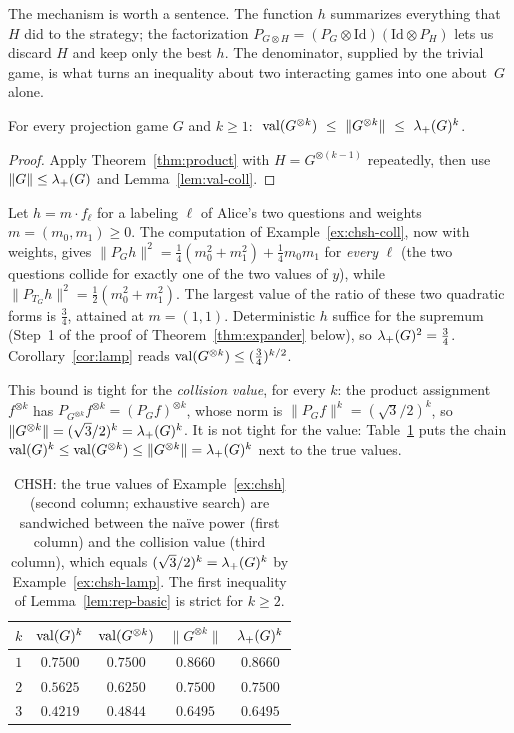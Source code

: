 \noindent
The mechanism is worth a sentence.  The function $h$ summarizes everything that $H$ did to the strategy; the factorization $P_{G\otimes H}=(P_G\otimes\mathrm{Id})(\mathrm{Id}\otimes P_H)$ lets us discard $H$ and keep only the best $h$.
The denominator, supplied by the trivial game, is what turns an inequality about two interacting games into one about~$G$ alone.

\begin{corollary}\label{cor:lamp}
For every projection game $G$ and $k\ge1$: $\ \operatorname{val}(G^{\otimes k})\ \le\ \|G^{\otimes k}\|\ \le\ \lambda_{+}(G)^k$.
\end{corollary}
\begin{proof}
Apply Theorem~\ref{thm:product} with $H=G^{\otimes(k-1)}$ repeatedly, then use $\|G\|\le\lambda_{+}(G)$ and Lemma~\ref{lem:val-coll}.
\end{proof}

\begin{example}\label{ex:chsh-lamp}
Let $h=m\cdot f_\ell$ for a labeling $\ell$ of Alice's two questions and weights $m=(m_0,m_1)\ge0$.  The computation of Example~\ref{ex:chsh-coll}, now with weights, gives $\|P_Gh\|^2=\frac14(m_0^2+m_1^2)+\frac14m_0m_1$ for \emph{every} $\ell$ (the two questions collide for exactly one of the two values of $y$), while $\|P_{T_G}h\|^2=\frac12(m_0^2+m_1^2)$.
The largest value of the ratio of these two quadratic forms is $\frac34$, attained at $m=(1,1)$.  Deterministic $h$ suffice for the supremum (Step~1 of the proof of Theorem~\ref{thm:expander} below), so $\lambda_{+}(G)^2=\frac34$.  Corollary~\ref{cor:lamp} reads $\operatorname{val}(G^{\otimes k})\le(\frac34)^{k/2}$.

This bound is tight for the \emph{collision value}, for every $k$: the product assignment $f^{\otimes k}$ has $P_{G^{\otimes k}}f^{\otimes k}=(P_Gf)^{\otimes k}$, whose norm is $\|P_Gf\|^k=(\sqrt3/2)^k$, so $\|G^{\otimes k}\|=(\sqrt3/2)^k=\lambda_{+}(G)^k$.
It is not tight for the value: Table~\ref{tab:chsh-sandwich} puts the chain $\operatorname{val}(G)^k\le\operatorname{val}(G^{\otimes k})\le\|G^{\otimes k}\|=\lambda_{+}(G)^k$ next to the true values.
\end{example}

\begin{table}[t]
\centering\small
\renewcommand{\arraystretch}{1.2}
\begin{tabular}{@{}rcccc@{}}
\toprule
$k$ & $\operatorname{val}(G)^k$ & $\operatorname{val}(G^{\otimes k})$ & $\|G^{\otimes k}\|$ & $\lambda_{+}(G)^k$\\
\midrule
$1$ & $0.7500$ & $0.7500$ & $0.8660$ & $0.8660$\\
$2$ & $0.5625$ & $0.6250$ & $0.7500$ & $0.7500$\\
$3$ & $0.4219$ & $0.4844$ & $0.6495$ & $0.6495$\\
\bottomrule
\end{tabular}
\caption{CHSH: the true values of Example~\ref{ex:chsh} (second column; exhaustive search) are sandwiched between the na\"ive power (first column) and the collision value (third column), which equals $(\sqrt3/2)^k=\lambda_{+}(G)^k$ by Example~\ref{ex:chsh-lamp}.  The first inequality of Lemma~\ref{lem:rep-basic} is strict for $k\ge2$.}
\label{tab:chsh-sandwich}
\end{table}

